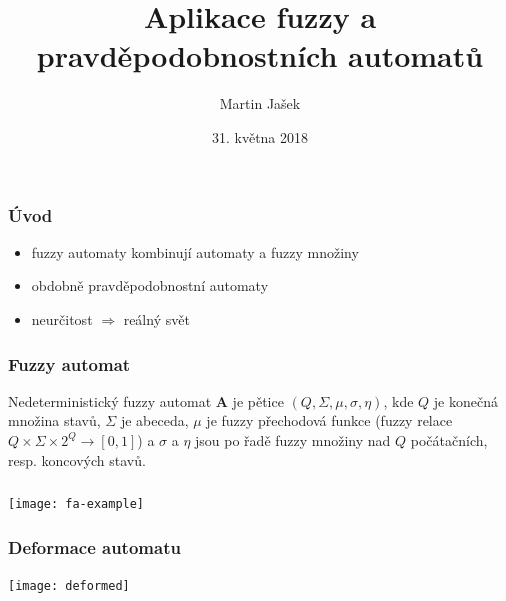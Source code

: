 \documentclass{beamer}
\title{Aplikace fuzzy a pravděpodobnostních automatů}
\author{Martin Jašek}
\date{31. května 2018}
\institute{UPOL}
\begin{document}
\begin{frame}	%
	\titlepage
\end{frame}

\begin{frame}	%
\frametitle{Úvod}
\begin{itemize}
	\item fuzzy automaty kombinují automaty a fuzzy množiny
	\item obdobně pravděpodobnostní automaty
	\item neurčitost $\Rightarrow$ reálný svět
\end{itemize}
\end{frame}

\begin{frame}	%
\frametitle{Fuzzy automat}
\begin{definition}\label{def-ZaklDefNedFuzzAut}
 Nedeterministický fuzzy automat $\mathbf{A}$ je pětice $(Q, \Sigma, \mu, \sigma, \eta)$, kde $Q$ je konečná množina stavů, $\Sigma$ je abeceda, $\mu$ je fuzzy přechodová funkce (fuzzy relace $Q \times \Sigma \times 2^Q \rightarrow [0, 1]$) a $\sigma$ a $\eta$ jsou po řadě fuzzy množiny nad $Q$ počátačních, resp. koncových stavů.
\end{definition}
\end{frame}

\begin{frame}	%
\frametitle{}
\centering 
\texttt{[image: fa-example]}
\end{frame}

\begin{frame}	%
\frametitle{Deformace automatu}
\centering
\texttt{[image: deformed]}
\end{frame}
\end{document}
